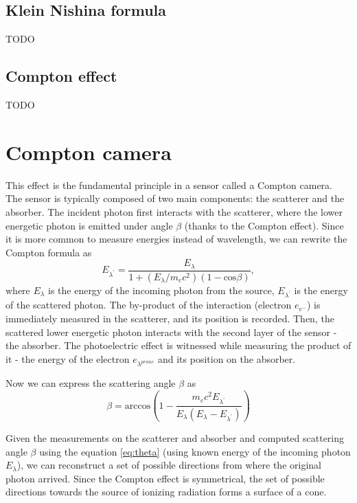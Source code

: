 {  \subsection{Klein Nishina formula}
  TODO

  \subsection{Compton effect}
  TODO


  \section{Compton camera}
  This effect is the fundamental principle in a sensor called a Compton camera. 
  The sensor is typically composed of two main components: the scatterer and the absorber. 
  The incident photon first interacts with the scatterer, where the lower energetic photon is emitted under angle $\beta$ (thanks to the Compton effect). 
  Since it is more common to measure energies instead of wavelength, we can rewrite the Compton formula as
  \begin{equation}
  E_{\lambda^{\prime}} = \frac{E_{\lambda}}{  1 + (E_{\lambda} / m_{e}c^{2}) (1 - \mathrm{cos} \beta)},
  \end{equation}
  where $E_{\lambda}$ is the energy of the incoming photon from the source, $E_{\lambda^{\prime}}$ is the energy of the scattered photon.  
  The by-product of the interaction (electron $e_{e^{-}}$) is immediately measured in the scatterer, and its position is recorded.
  Then, the scattered lower energetic photon interacts with the second layer of the sensor - the absorber. 
  The photoelectric effect is witnessed while measuring the product of it - the energy of the electron $e_{\lambda^{prime}}$ and its position on the absorber.

  Now we can express the scattering angle $\beta$ as
  \begin{equation}
      \beta = \mathrm{arccos} \left (  1-\frac{m_{e}c^{2}E_{\lambda^{\prime}}}{E_{\lambda} (E_{\lambda} - E_{\lambda^{\prime}})} \right )
  \end{equation}

  Given the measurements on the scatterer and absorber and computed scattering angle $\beta$ using the equation \autoref{eq:theta} (using known energy of the incoming photon $E_{\lambda}$), we can reconstruct a set of possible directions from where the original photon arrived. Since the Compton effect is symmetrical, the set of possible directions towards the source of ionizing radiation forms a surface of a cone.



}
